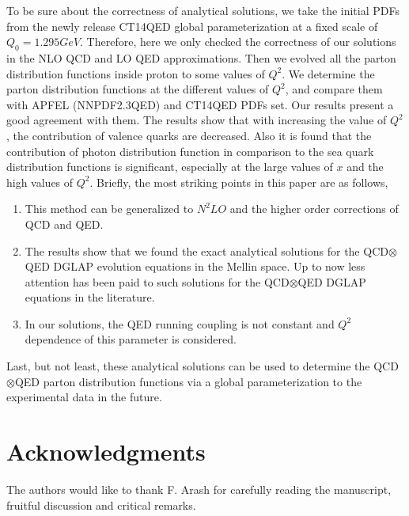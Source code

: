 \documentclass[review]{elsarticle}
\begin{document}
To be sure about the correctness of analytical solutions, we take
the initial PDFs from the newly release CT14QED global parameterization
at a fixed scale of $Q_{0}=1.295GeV$. Therefore, here we only checked the correctness of our solutions in the NLO QCD and LO QED approximations. Then we evolved
all the parton distribution functions inside proton to some values
of $Q^{2}$. We determine the parton distribution functions  at the different values of $Q^{2}$, and compare
them with APFEL (NNPDF2.3QED) and CT14QED PDFs set. Our results
present a good agreement with them. The results show that with increasing
the value of $Q^{2}$, the contribution of valence quarks are decreased.
Also it is found that the contribution of photon distribution
function in comparison to the sea quark distribution functions is
significant, especially at the large values of $x$ and the high values of $Q^{2}$.
Briefly, the most striking points in this paper are as follows,
\begin{enumerate}
\item This method can be generalized to $N^{2}LO$ and the higher
order corrections of QCD and QED.
\item The results show that we found the exact analytical solutions for the QCD$\otimes$QED DGLAP evolution equations in
the Mellin space. Up to now less attention has been paid to such solutions
for the QCD$\otimes$QED DGLAP equations in the literature.
\item In our solutions, the QED running coupling is not constant and $Q^{2}$ dependence of this
parameter is considered.
\end{enumerate}
Last, but not least, these analytical solutions can be used to
determine the QCD$\otimes$QED parton distribution functions via
a global parameterization to the experimental data in the future.

\section*{Acknowledgments}
The authors would like to thank F. Arash for carefully reading the manuscript, fruitful discussion and critical remarks. 
\end{document}
